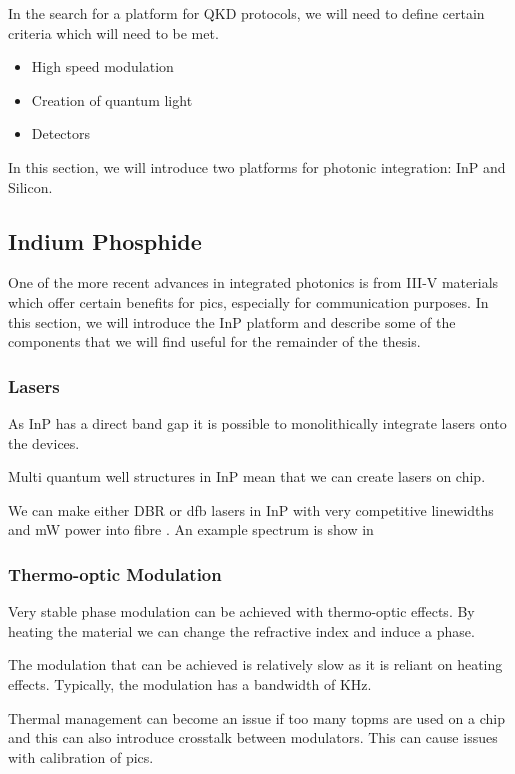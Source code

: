 In the search for a platform for \ac{QKD} protocols, we will need to define certain criteria which will need to be met.

\begin{itemize}
	\item High speed modulation
	\item Creation of quantum light
	\item Detectors
\end{itemize}

In this section, we will introduce two platforms for photonic integration: \Ac{InP} and Silicon.

\subsection{Indium Phosphide}

One of the more recent advances in integrated photonics is from III-V materials which offer certain benefits for \acp{pic}, especially for communication purposes. In this section, we will introduce the \acl{InP} platform and describe some of the components that we will find useful for the remainder of the thesis.

\subsubsection*{Lasers}

As \ac{InP} has a direct band gap it is possible to monolithically integrate lasers onto the devices. 

Multi quantum well structures in \ac{InP} mean that we can create lasers on chip.

We can make either \ac{DBR} or \ac{dfb} lasers in \ac{InP} with very competitive linewidths and mW power into fibre \cite{jeppix}. An example spectrum is show in 

\subsubsection*{Thermo-optic Modulation}

Very stable phase modulation can be achieved with thermo-optic effects. By heating the material we can change the refractive index and induce a phase.

The modulation that can be achieved is relatively slow as it is reliant on heating effects. Typically, the modulation has a bandwidth of KHz. 

Thermal management can become an issue if too many \acp{topm} are used on a chip and this can also introduce crosstalk between modulators. This can cause issues with calibration of \acp{pic}.

